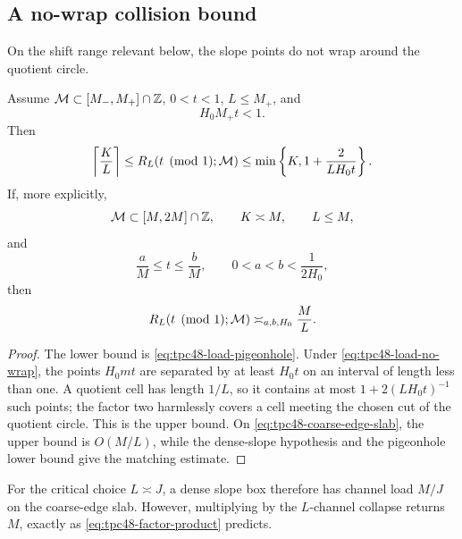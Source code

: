 \subsection{A no-wrap collision bound}

On the shift range relevant below, the slope points do not wrap around
the quotient circle.

\begin{proposition}
\label{prop:tpc48-load-bounds}
Assume \(\mathcal M\subset[M_-,M_+]\cap\mathbb Z\), \(0<t<1\),
\(L\le M_+\), and
\begin{equation}
 H_0M_+t<1.
 \label{eq:tpc48-load-no-wrap}
\end{equation}
Then
\begin{equation}
 \left\lceil\frac KL\right\rceil
 \le R_L(t\pmod1;\mathcal M)
 \le\min\left\{K,1+\frac2{LH_0t}\right\}.
 \label{eq:tpc48-load-bounds}
\end{equation}
If, more explicitly,
\begin{equation}
 \mathcal M\subset[M,2M]\cap\mathbb Z,
 \qquad K\asymp M,
 \qquad L\le M,
 \label{eq:tpc48-dense-slope-box}
\end{equation}
and
\begin{equation}
 \frac aM\le t\le\frac bM,
 \qquad 0<a<b<\frac1{2H_0},
 \label{eq:tpc48-coarse-edge-slab}
\end{equation}
then
\begin{equation}
 R_L(t\pmod1;\mathcal M)\asymp_{a,b,H_0}\frac ML.
 \label{eq:tpc48-dense-load}
\end{equation}
\end{proposition}

\begin{proof}
The lower bound is \eqref{eq:tpc48-load-pigeonhole}.  Under
\eqref{eq:tpc48-load-no-wrap}, the points \(H_0mt\) are separated by
at least \(H_0t\) on an interval of length less than one.  A quotient
cell has length \(1/L\), so it contains at most
\(1+2(LH_0t)^{-1}\) such points; the factor two harmlessly covers a
cell meeting the chosen cut of the quotient circle.  This is the upper
bound.  On
\eqref{eq:tpc48-coarse-edge-slab}, the upper bound is \(O(M/L)\), while
the dense-slope hypothesis and the pigeonhole lower bound give the
matching estimate.
\end{proof}

For the critical choice \(L\asymp J\), a dense slope box therefore has
channel load \(M/J\) on the coarse-edge slab.  However, multiplying by
the \(L\)-channel collapse returns \(M\), exactly as
\eqref{eq:tpc48-factor-product} predicts.

